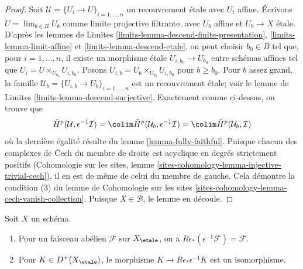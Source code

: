 \begin{proof}
\medskip\noindent
Soit $\mathcal{U} = \{U_i \to U\}_{i = 1, \ldots, n}$ un recouvrement \'etale
avec $U_i$ affine. Écrivons $U = \lim_{b \in B} U_b$ comme limite projective filtrante,
avec $U_b$ affine et $U_b \to X$ \'etale.
D'après les lemmes de Limites \ref{limits-lemma-descend-finite-presentation},
\ref{limits-lemma-limit-affine} et
\ref{limits-lemma-descend-etale},
on peut choisir $b_0 \in B$ tel que, pour $i = 1, \ldots, n$, il existe un
morphisme \'etale $U_{i, b_0} \to U_{b_0}$ entre schémas affines
tel que $U_i = U \times_{U_{b_0}} U_{i, b_0}$.
Posons $U_{i, b} = U_b \times_{U_{b_0}} U_{i, b_0}$ pour $b \geq b_0$.
Pour $b$ assez grand, la famille
$\mathcal{U}_b = \{U_{i, b} \to U_b\}_{i = 1, \ldots, n}$
est un recouvrement \'etale; voir le
lemme de Limites \ref{limits-lemma-descend-surjective}.
Exactement comme ci-dessus, on trouve que
$$
\check{H}^p(\mathcal{U}, \epsilon^{-1}\mathcal{I}) =
\colim \check{H}^p(\mathcal{U}_b, \epsilon^{-1}\mathcal{I}) =
\colim \check{H}^p(\mathcal{U}_b, \mathcal{I})
$$
où la dernière égalité résulte du lemme \ref{lemma-fully-faithful}.
Puisque chacun des complexes de {\v C}ech du membre de droite est
acyclique en degrés strictement positifs
(Cohomologie sur les sites, lemme
\ref{sites-cohomology-lemma-injective-trivial-cech}),
il en est de même de celui du membre de gauche. Cela démontre la condition (3) du
lemme de Cohomologie sur les sites \ref{sites-cohomology-lemma-cech-vanish-collection}.
Puisque $X \in \mathcal{B}$, le lemme en découle.
\end{proof}

\begin{lemma}
\label{lemma-relative-comparison}
Soit $X$ un schéma.
\begin{enumerate}
\item Pour un faisceau abélien $\mathcal{F}$ sur $X_\etale$,
on a $R\epsilon_*(\epsilon^{-1}\mathcal{F}) = \mathcal{F}$.
\item Pour $K \in D^+(X_\etale)$, le morphisme $K \to R\epsilon_*\epsilon^{-1}K$
est un isomorphisme.
\end{enumerate}
\end{lemma}

